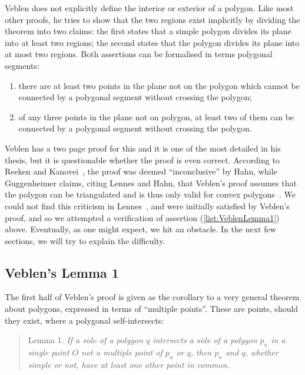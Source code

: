 Veblen does not explicitly define the interior or exterior of a polygon. Like most other proofs, he tries to show that the two regions exist implicitly by dividing the theorem into two claims: the first states that a simple polygon divides its plane into at least two regions; the second states that the polygon divides its plane into at most two regions. Both assertions can be formalised in terms polygonal segments:
\begin{enumerate}
\item there are at least two points in the plane not on the polygon which cannot be connected by a polygonal segment without crossing the polygon\label{list:VeblenLemma1};
\item of any three points in the plane not on polygon, at least two of them can be connected by a polygonal segment without crossing the polygon.
\end{enumerate}

Veblen has a two page proof for this and it is one of the most detailed in his thesis, but it is questionable whether the proof is even correct. According to Reeken and Kanovei~\cite{HahnInconclusiveIndirect}, the proof was deemed ``inconclusive'' by Hahn, while Guggenheimer claims, citing Lennes and Hahn, that Veblen's proof assumes that the polygon can be triangulated and is thus only valid for convex polygons~\cite{GuggenheimerJordanCurve}. We could not find this criticism in Lennes~\cite{LennesPolygon}, and were initially satisfied by Veblen's proof, and so we attempted a verification of assertion (\ref{list:VeblenLemma1}) above. Eventually, as one might expect, we hit an obstacle. In the next few sections, we will try to explain the difficulty.

\subsection{Veblen's Lemma 1}\label{sec:VeblenLemma1}
The first half of Veblen's proof is given as the corollary to a very general theorem about polygons, expressed in terms of ``multiple points''. These are points, should they exist, where a polygonal self-intersects:
\begin{quote}
Lemma 1. \emph{If a side of a polygon $q$ intersects a side of a polygon $p_n$ in a single point $O$ not a multiple point of $p_n$ or $q$, then $p_n$ and $q$, whether simple or not, have at least one other point in common.} 
\end{quote}


